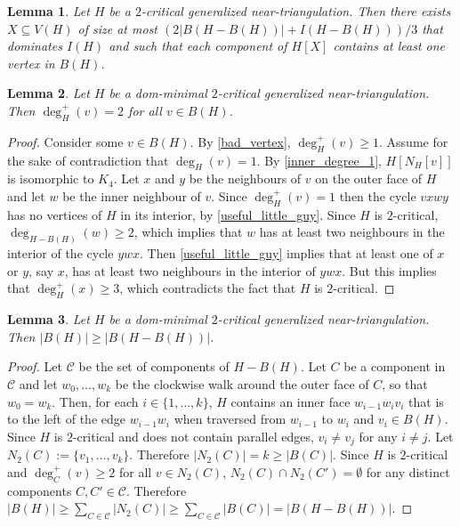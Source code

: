 \documentclass[a4paper,UKenglish,cleveref, autoref, thm-restate]{lipics-v2021}
\newtheorem{lem}{Lemma}
\begin{document}
\begin{lem}\label{two_critical_handler}
  Let $H$ be a $2$-critical generalized near-triangulation.  Then there exists $X\subseteq V(H)$ of size at most $(2|B(H-B(H))| + I(H-B(H)))/3$ that dominates $I(H)$ and such that each component of $H[X]$ contains at least one vertex in $B(H)$.
\end{lem}


\begin{lem}
  Let $H$ be a dom-minimal $2$-critical generalized near-triangulation.  Then $\deg^+_H(v)=2$ for all $v\in B(H)$.
\end{lem}

\begin{proof}
  Consider some $v\in B(H)$. By \cref{bad_vertex}, $\deg^+_H(v)\ge 1$. Assume for the sake of contradiction that $\deg_H(v)=1$. By \cref{inner_degree_1}, $H[N_H[v]]$ is isomorphic to $K_4$. Let $x$ and $y$ be the neighbours of $v$ on the outer face of $H$ and let $w$ be the inner neighbour of $v$. Since $\deg^+_H(v)=1$ then the cycle $vxwy$ has no vertices of $H$ in its interior, by \cref{useful_little_guy}.  Since $H$ is $2$-critical, $\deg_{H-B(H)}(w)\ge 2$, which implies that $w$ has at least two neighbours in the interior of the cycle $ywx$.  Then \cref{useful_little_guy}  implies that at least one of $x$ or $y$, say $x$, has at least two neighbours in the interior of $ywx$.  But this implies that $\deg^+_H(x)\ge 3$, which contradicts the fact that $H$ is $2$-critical.
\end{proof}


\begin{lem}\label{two_critical_boundary_size}
  Let $H$ be a dom-minimal $2$-critical generalized near-triangulation.  Then $|B(H)|\ge |B(H-B(H))|$.
\end{lem}

\begin{proof}
  Let $\mathcal{C}$ be the set of components of $H-B(H)$.
  Let $C$ be a component in $\mathcal{C}$ and let $w_0,\ldots,w_k$ be the clockwise walk around the outer face of $C$, so that $w_0=w_k$.  Then, for each $i\in\{1,\ldots,k\}$, $H$ contains an inner face $w_{i-1}w_iv_i$ that is to the left of the edge $w_{i-1}w_i$ when traversed from $w_{i-1}$ to $w_i$ and $v_i\in B(H)$.  Since $H$ is $2$-critical and does not contain parallel edges, $v_i\neq v_j$ for any $i\neq j$. Let $N_2(C):=\{v_1,\ldots,v_k\}$.  Therefore $|N_2(C)|= k\ge |B(C)|$. Since $H$ is $2$-critical and $\deg^+_C(v)\ge 2$ for all $v\in N_2(C)$, $N_2(C)\cap N_2(C')=\emptyset$ for any distinct components $C,C'\in\mathcal{C}$.  Therefore $|B(H)|\ge \sum_{C\in\mathcal{C}} |N_2(C)|\ge \sum_{C\in\mathcal{C}} |B(C)|=|B(H-B(H))|$.
\end{proof}
\end{document}
